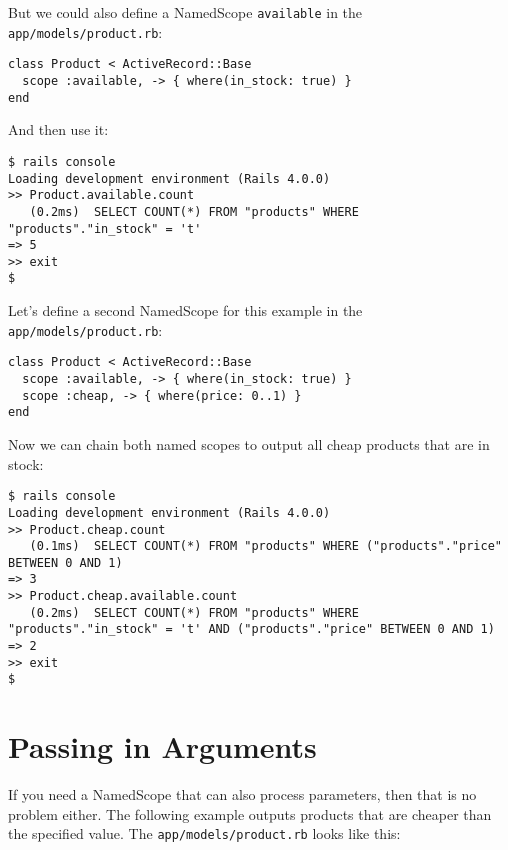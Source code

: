 \documentclass[a4paper]{book}
\begin{document}
But we could also define a NamedScope \texttt{available} in the \texttt{app/models/product.rb}:

\begin{shaded}\begin{verbatim}
class Product < ActiveRecord::Base
  scope :available, -> { where(in_stock: true) }
end
\end{verbatim}\end{shaded}

And then use it:

\begin{shaded}\begin{verbatim}
$ rails console
Loading development environment (Rails 4.0.0)
>> Product.available.count
   (0.2ms)  SELECT COUNT(*) FROM "products" WHERE "products"."in_stock" = 't'
=> 5
>> exit
$
\end{verbatim}\end{shaded}

Let's define a second NamedScope for this example in the \texttt{app/models/product.rb}:

\begin{shaded}\begin{verbatim}
class Product < ActiveRecord::Base
  scope :available, -> { where(in_stock: true) }
  scope :cheap, -> { where(price: 0..1) }
end
\end{verbatim}\end{shaded}

Now we can chain both named scopes to output all cheap products that are in stock:

\begin{shaded}\begin{verbatim}
$ rails console
Loading development environment (Rails 4.0.0)
>> Product.cheap.count
   (0.1ms)  SELECT COUNT(*) FROM "products" WHERE ("products"."price" BETWEEN 0 AND 1)
=> 3
>> Product.cheap.available.count
   (0.2ms)  SELECT COUNT(*) FROM "products" WHERE "products"."in_stock" = 't' AND ("products"."price" BETWEEN 0 AND 1)
=> 2
>> exit
$
\end{verbatim}\end{shaded}

\section{Passing in Arguments}\label{passing-in-arguments}

If you need a NamedScope that can also process parameters, then that is no problem either. The following example outputs products that are cheaper than the specified value. The \texttt{app/models/product.rb} looks like this:
\end{document}
